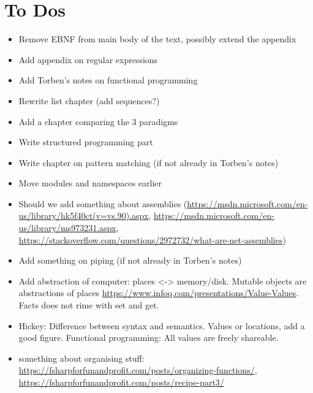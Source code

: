 \chapter{To Dos}
\begin{itemize}
\item Remove EBNF from main body of the text, possibly extend the
  appendix
\item Add appendix on regular expressions
\item Add Torben's notes on functional programming
\item Rewrite list chapter (add sequences?)
\item Add a chapter comparing the 3 paradigms
\item Write structured programming part
\item Write chapter on pattern matching (if not already in Torben's
  notes)
\item Move modules and namespaces earlier
\item Should we add something about assemblies
  (\url{https://msdn.microsoft.com/en-us/library/hk5f40ct(v=vs.90).aspx},
  \url{https://msdn.microsoft.com/en-us/library/ms973231.aspx}, \url{https://stackoverflow.com/questions/2972732/what-are-net-assemblies})
\item Add something on piping (if not already in Torben's notes)
\item Add abstraction of computer: places <-> memory/disk. Mutable
  objects are abstractions of places
  \url{https://www.infoq.com/presentations/Value-Values}. Facts does
  not rime with set and get. 
\item Hickey: Difference between syntax and semantics. Values or
  locations, add a good figure. Functional programming: All values are
  freely shareable.
\item something about organising stuff: \url{https://fsharpforfunandprofit.com/posts/organizing-functions/},
  \url{https://fsharpforfunandprofit.com/posts/recipe-part3/}
\end{itemize}
